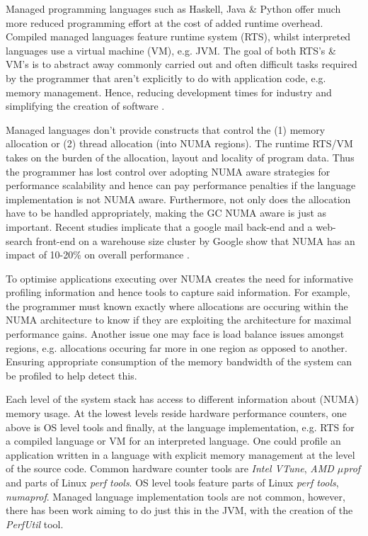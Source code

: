 \documentclass{paper}\usepackage{graphicx}
\begin{document}
Managed programming languages such as Haskell, Java \& Python offer much more reduced programming effort at the cost of added runtime overhead. Compiled managed languages feature runtime system (RTS), whilst interpreted languages use a virtual machine (VM), e.g. JVM. The goal of both RTS's \& VM's is to abstract away commonly carried out and often difficult tasks required by the programmer that aren't explicitly to do with application code, e.g. memory management. Hence, reducing development times for industry and simplifying the creation of software \cite{DBLP:conf/sac/ValkovCT18,DBLP:journals/concurrency/NystromTK08}.

Managed languages don't provide constructs that control the (1) memory allocation or (2) thread allocation (into NUMA regions). The runtime RTS/VM takes on the burden of the allocation, layout and locality of program data. Thus the programmer has lost control over adopting NUMA aware strategies for performance scalability and hence can pay performance penalties if the language implementation is not NUMA aware. Furthermore, not only does the allocation have to be handled appropriately, making the GC NUMA aware is just as important\cite{DBLP:conf/pppj/PapadakisZFK20}. Recent studies implicate that a google mail back-end and a web-search front-end on a warehouse size cluster by Google show that NUMA has an impact of 10-20\% on overall performance \cite{DBLP:conf/hpca/TangMZHHT13}.

To optimise applications executing over NUMA creates the need for informative profiling information and hence tools to capture said information. For example, the programmer must known exactly where allocations are occuring within the NUMA architecture to know if they are exploiting the architecture for maximal performance gains. Another issue one may face is load balance issues amongst regions, e.g. allocations occuring far more in one region as opposed to another. Ensuring appropriate consumption of the memory bandwidth of the system can be profiled to help detect this.

Each level of the system stack has access to different information about (NUMA) memory usage. At the lowest levels reside hardware performance counters, one above is OS level tools and finally, at the language implementation, e.g. RTS for a compiled language or VM for an interpreted language. One could profile an application written in a language with explicit memory management at the level of the source code. Common hardware counter tools are \textit{Intel VTune}, \textit{AMD $\mu$prof} and parts of Linux \textit{perf tools}. OS level tools feature parts of Linux \textit{perf tools}, \textit{numaprof}. Managed language implementation tools are not common, however, there has been work aiming to do just this in the JVM, with the creation of the \textit{PerfUtil} tool.
\end{document}

